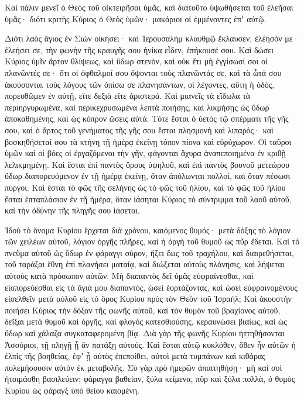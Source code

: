 {\par }{\PP {}Καὶ πάλιν μενεῖ ὁ Θεὸς τοῦ οἰκτειρῆσαι ὑμᾶς, καὶ διατοῦτο ὑψωθήσεται τοῦ ἐλεῆσαι ὑμᾶς· διότι κριτὴς Κύριος ὁ Θεὸς ὑμῶν· μακάριοι οἱ ἐμμένοντες ἐπʼ αὐτῷ.
\par }{\PP {}Διότι λαὸς ἅγιος ἐν Σιὼν οἰκήσει· καὶ Ἰερουσαλὴμ κλαυθμῷ ἔκλαυσεν, ἐλέησόν με· ἐλεήσει σε, τὴν φωνὴν τῆς κραυγῆς σου ἡνίκα εἶδεν, ἐπήκουσέ σου.
Καὶ δώσει Κύριος ὑμῖν ἄρτον θλίψεως, καὶ ὕδωρ στενὸν, καὶ οὐκ ἔτι μὴ ἐγγίσωσί σοι οἱ πλανῶντές σε· ὅτι οἱ ὀφθαλμοί σου ὄψονται τοὺς πλανῶντάς σε,
καὶ τὰ ὦτά σου ἀκούσονται τοὺς λόγους τῶν ὀπίσω σε πλανησάντων, οἱ λέγοντες, αὕτη ἡ ὁδὸς, πορευθῶμεν ἐν αὐτῇ, εἴτε δεξιὰ εἴτε ἀριστερά.
Καὶ μιανεῖς τὰ εἴδωλα τὰ περιηργυρωμένα, καὶ περικεχρυσωμένα λεπτὰ ποιήσῃς, καὶ λικμήσῃς ὡς ὕδωρ ἀποκαθημένης, καὶ ὡς κόπρον ὤσεις αὐτά.
Τότε ἔσται ὁ ὑετὸς τῷ σπέρματι τῆς γῆς σου, καὶ ὁ ἄρτος τοῦ γενήματος τῆς γῆς σου ἔσται πλησμονὴ καὶ λιπαρός· καὶ βοσκηθήσεταί σου τὰ κτήνη τῇ ἡμέρᾳ ἐκείνῃ τόπον πίονα καὶ εὐρύχωρον.
Οἱ ταῦροι ὑμῶν καὶ οἱ βόες οἱ ἐργαζόμενοι τὴν γῆν, φάγονται ἄχυρα ἀναπεποιημένα ἐν κριθῇ λελικμημένῃ.
Καὶ ἔσται ἐπὶ παντὸς ὄρους ὑψηλοῦ, καὶ ἐπὶ παντὸς βουνοῦ μετεώρου ὕδωρ διαπορευόμενον ἐν τῇ ἡμέρᾳ ἐκείνῃ, ὅταν ἀπόλωνται πολλοὶ, καὶ ὅταν πέσωσι πύργοι.
Καὶ ἔσται τὸ φῶς τῆς σελήνης ὡς τὸ φῶς τοῦ ἡλίου, καὶ τὸ φῶς τοῦ ἡλίου ἔσται ἑπταπλάσιον ἐν τῇ ἡμέρα, ὅταν ἰάσηται Κύριος τὸ σύντριμμα τοῦ λαοῦ αὐτοῦ, καὶ τὴν ὀδύνην τῆς πληγῆς σου ἰάσεται.
\par }{\PP {}Ἰδοὺ τὸ ὄνομα Κυρίου ἔρχεται διὰ χρόνου, καιόμενος θυμός· μετὰ δόξης τὸ λόγιον τῶν χειλέων αὐτοῦ, λόγιον ὀργῆς πλῆρες, καὶ ἡ ὀργὴ τοῦ θυμοῦ ὡς πῦρ ἔδεται.
Καὶ τὸ πνεῦμα αὐτοῦ ὡς ὕδωρ ἐν φάραγγι σὺρον, ἥξει ἕως τοῦ τραχήλου, καὶ διαιρεθήσεται, τοῦ ταράξαι ἔθνη ἐπὶ πλανήσει ματαίᾳ, καὶ διώξεται αὐτοὺς πλάνησις, καὶ λήψεται αὐτοὺς κατὰ πρόσωπον αὐτῶν.
Μὴ διαπαντὸς δεῖ ὑμᾶς εὐφραίνεσθαι, καὶ εἰσπορεύεσθαι εἰς τὰ ἅγιά μου διαπαντὸς, ὡσεὶ ἑορτάζοντας, καὶ ὡσεὶ εὐφραινομένους εἰσελθεῖν μετὰ αὐλοῦ εἰς τὸ ὄρος Κυρίου πρὸς τὸν Θεὸν τοῦ Ἰσραήλ;
Καὶ ἀκουστὴν ποιήσει Κύριος τὴν δόξαν τῆς φωνῆς αὐτοῦ, καὶ τὸν θυμὸν τοῦ βραχίονος αὐτοῦ, δεῖξαι μετὰ θυμοῦ καὶ ὀργῆς, καὶ φλογὸς κατεσθιούσης, κεραυνώσει βιαίως, καὶ ὡς ὕδωρ καὶ χάλαζα συγκαταφερομένη βίᾳ.
Διὰ γὰρ τῆς φωνῆς Κυρίου ἡττηθήσονται Ἀσσύριοι, τῇ πληγῇ ᾗ ἂν πατάξῃ αὐτούς.
Καὶ ἔσται αὐτῷ κυκλόθεν, ὅθεν ἦν αὐτῶν ἡ ἐλπὶς τῆς βοηθείας, ἐφʼ ᾗ αὐτὸς ἐπεποίθει, αὐτοὶ μετὰ τυμπάνων καὶ κιθάρας πολεμήσουσιν αὐτὸν ἐκ μεταβολῆς.
Σὺ γὰρ πρὸ ἡμερῶν ἀπαιτηθήσῃ· μὴ καί σοὶ ἡτοιμάσθη βασιλεύειν; φάραγγα βαθείαν, ξύλα κείμενα, πῦρ καὶ ξύλα πολλὰ, ὁ θυμὸς Κυρίου ὡς φάραγξ ὑπὸ θείου καιομένη.

}
